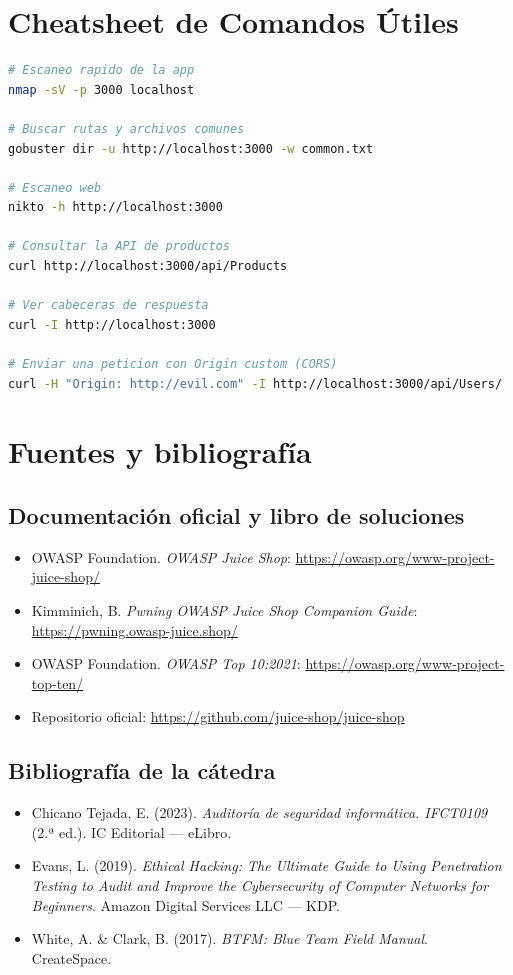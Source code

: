 \documentclass[11pt,a4paper]{article}
\begin{document}
\section{Cheatsheet de Comandos Útiles}

\begin{lstlisting}[language=bash]
# Escaneo rapido de la app
nmap -sV -p 3000 localhost

# Buscar rutas y archivos comunes
gobuster dir -u http://localhost:3000 -w common.txt

# Escaneo web
nikto -h http://localhost:3000

# Consultar la API de productos
curl http://localhost:3000/api/Products

# Ver cabeceras de respuesta
curl -I http://localhost:3000

# Enviar una peticion con Origin custom (CORS)
curl -H "Origin: http://evil.com" -I http://localhost:3000/api/Users/
\end{lstlisting}

\section{Fuentes y bibliografía}

\subsection{Documentación oficial y libro de soluciones}
\begin{itemize}[leftmargin=*]
  \item OWASP Foundation. \textit{OWASP Juice Shop}: \url{https://owasp.org/www-project-juice-shop/}
  \item Kimminich, B. \textit{Pwning OWASP Juice Shop Companion Guide}: \url{https://pwning.owasp-juice.shop/}
  \item OWASP Foundation. \textit{OWASP Top 10:2021}: \url{https://owasp.org/www-project-top-ten/}
  \item Repositorio oficial: \url{https://github.com/juice-shop/juice-shop}
\end{itemize}

\subsection{Bibliografía de la cátedra}
\begin{itemize}[leftmargin=*]
  \item Chicano Tejada, E. (2023). \textit{Auditoría de seguridad informática. IFCT0109} (2.ª ed.). IC Editorial --- eLibro.
  \item Evans, L. (2019). \textit{Ethical Hacking: The Ultimate Guide to Using Penetration Testing to Audit and Improve the Cybersecurity of Computer Networks for Beginners}. Amazon Digital Services LLC --- KDP.
  \item White, A. \& Clark, B. (2017). \textit{BTFM: Blue Team Field Manual}. CreateSpace.
\end{itemize}
\end{document}
